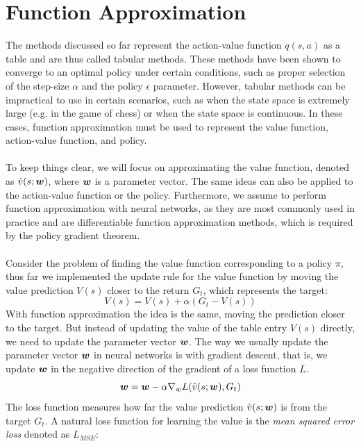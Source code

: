 \section{Function Approximation}
The methods discussed so far represent the action-value function $q(s, a)$ as a table and are thus called tabular methods. These methods have been shown to converge to an optimal policy under certain conditions, such as proper selection of the step-size $\alpha$ and the policy $\epsilon$ parameter. However, tabular methods can be impractical to use in certain scenarios, such as when the state space is extremely large (e.g. in the game of chess) or when the state space is continuous. In these cases, function approximation must be used to represent the value function, action-value function, and policy.\\\\
To keep things clear, we will focus on approximating the value function, denoted as $\hat{v}(s; \boldsymbol{w})$, where $\boldsymbol{w}$ is a parameter vector. The same ideas can also be applied to the action-value function or the policy. Furthermore, we assume to perform function approximation with neural networks, as they are most commonly used in practice and are differentiable function approximation methods, which is required by the policy gradient theorem.\\\\
Consider the problem of finding the value function corresponding to a policy $\pi$, thus far we implemented the update rule for the value function by moving the value prediction $V(s)$ closer to the return $G_t$, which represents the target:
\begin{equation}
    V(s) = V(s) + \alpha (G_t - V(s))
    \label{eq:tabular-update}
\end{equation}
With function approximation the idea is the same, moving the prediction closer to the target. But instead of updating the value of the table entry $V(s)$ directly, we need to update the parameter vector $\boldsymbol{w}$. The way we usually update the parameter vector $\boldsymbol{w}$ in neural networks is with gradient descent, that is, we update $\boldsymbol{w}$ in the negative direction of the gradient of a loss function $L$.
\begin{equation}
    \boldsymbol{w} = \boldsymbol{w} - \alpha \nabla_w L(\hat{v}(s; \boldsymbol{w}), G_t)
    \label{eq:nn-update}
\end{equation}
The loss function measures how far the value prediction $\hat{v}(s; \boldsymbol{w})$ is from the target $G_t$. A natural loss function for learning the value is the \textit{mean squared error loss} denoted as $L_{MSE}$:
